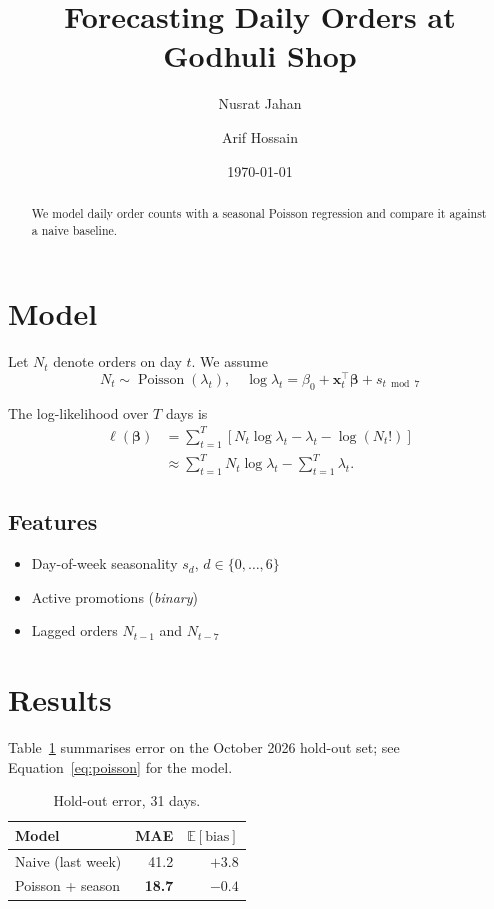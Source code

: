 \documentclass[11pt,a4paper]{article}
\title{Forecasting Daily Orders at Godhuli Shop}
\author{Nusrat Jahan \and Arif Hossain}
\date{\today}
\newcommand{\E}{\mathbb{E}}
\newcommand{\orders}[1]{N_{#1}}
\renewcommand{\vec}[1]{\mathbf{#1}}
\begin{document}
\maketitle

\begin{abstract}
We model daily order counts with a seasonal Poisson regression and compare it
against a naive baseline. %
\end{abstract}

\section{Model}
\label{sec:model}

Let $\orders{t}$ denote orders on day $t$. We assume
\begin{equation}
  \orders{t} \sim \operatorname{Poisson}(\lambda_t), \quad
  \log \lambda_t = \beta_0 + \vec{x}_t^\top \vec{\beta} + s_{t \bmod 7}
  \label{eq:poisson}
\end{equation}

The log-likelihood over $T$ days is
\begin{align}
  \ell(\vec{\beta}) &= \sum_{t=1}^{T} \left[ \orders{t} \log \lambda_t - \lambda_t - \log(\orders{t}!) \right] \\
                    &\approx \sum_{t=1}^{T} \orders{t} \log \lambda_t - \sum_{t=1}^{T} \lambda_t .
\end{align}

\subsection{Features}
\begin{itemize}
  \item Day-of-week seasonality $s_d$, $d \in \{0, \dots, 6\}$
  \item Active promotions (\emph{binary})
  \item Lagged orders $\orders{t-1}$ and $\orders{t-7}$
\end{itemize}

\section{Results}
Table~\ref{tab:results} summarises error on the October 2026 hold-out set;
see Equation~\eqref{eq:poisson} for the model.

\begin{table}[h]
  \centering
  \begin{tabular}{lrr}
    \toprule
    Model            & MAE   & $\E[\text{bias}]$ \\
    \midrule
    Naive (last week) & 41.2 & $+3.8$ \\
    Poisson + season  & \textbf{18.7} & $-0.4$ \\
    \bottomrule
  \end{tabular}
  \caption{Hold-out error, 31 days.}
  \label{tab:results}
\end{table}
\end{document}
